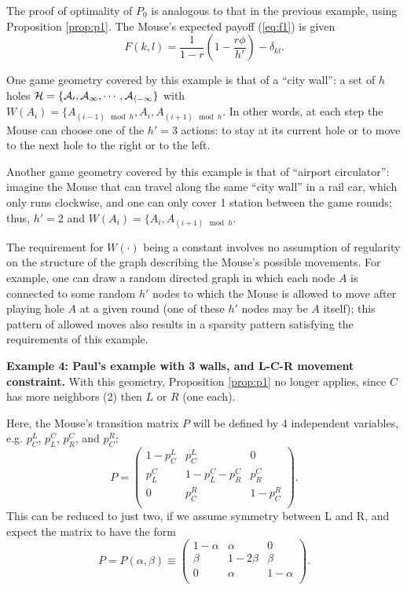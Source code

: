 \documentclass[12pt]{article}
\begin{document}
The proof of optimality of $P_0$ is analogous to that in the previous example, using Proposition \ref{prop:p1}.  The Mouse's expected payoff (\ref{eq:f1}) is given
\begin{equation}
\label{eq:payoff:ex3}
F(k,l) = \frac{1}{1-r} \left(1  - \frac{r\phi}{h'}\right) - \delta_{kl}.
\end{equation}

One game geometry covered by this example is that of a ``city wall'': a set of $h$ holes $\cal{H}=\{A_0, A_1, \cdots, A_{h-1}\}$ with $W(A_i) = \{A_{(i-1) \mod h}, A_i, A_{(i+1) \mod h}$. In other words, at each step the Mouse can choose one of the $h'=3$ actions: to stay at its current hole or to move  to the next hole to the right or to the left.

Another game geometry covered by this example is that of ``airport circulator'': imagine the Mouse that can travel along the same ``city wall'' in a rail car, which only runs clockwise, and one can only cover 1 station between the game rounds; thus, $h'=2$ and  $W(A_i) = \{A_i, A_{(i+1) \mod h}$.

The requirement for $W(\cdot)$ being a constant involves no assumption of regularity on the structure of the graph describing the Mouse's possible movements. For example, one can draw a random directed graph in which each node $A$ is connected to some random $h'$ nodes to which the Mouse is allowed to move after playing hole $A$ at a given round (one of these $h'$ nodes  may be $A$ itself); this pattern of allowed moves also results in a sparsity pattern satisfying the requirements of this example.

{\bf Example 4: Paul's example with 3 walls, and L-C-R movement constraint.} With this geometry,  Proposition \ref{prop:p1} no longer applies, since $C$ has more neighbors (2) then $L$ or $R$ (one each). 

Here, the Mouse's transition matrix $P$ will be defined by 4 independent variables, e.g. $p^L_C$, $p^C_L$,  $p^C_R$, and $p^R_C$:
$$ P=
\begin{pmatrix} 
 1-p^L_C & p^L_C         & 0 \\
 p^C_L   & 1- p^C_L-p^C_R & p^C_R \\
0       & p^R_C          & 1-p^R_C \\
\end{pmatrix}.
$$
This can be reduced to just two, if we assume symmetry between L and R, 
and expect the matrix to have the form
\begin{equation}
\label{eq:lcrP}
P=P(\alpha,\beta) \equiv
\begin{pmatrix} 
 1-\alpha  & \alpha & 0 \\
 \beta  &   1-2\beta & \beta \\
0 & \alpha & 1-\alpha \\
\end{pmatrix}.
\end{equation}
\end{document}
